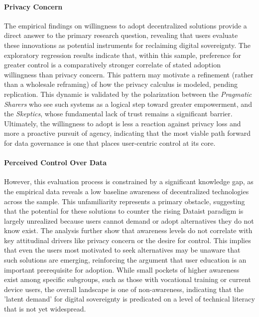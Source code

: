 	\paragraph{Privacy Concern}
	The empirical findings on willingness to adopt decentralized solutions provide a direct answer to the primary research question, revealing that users evaluate these innovations as potential instruments for reclaiming digital sovereignty. The exploratory regression results indicate that, within this sample, preference for greater control is a comparatively stronger correlate of stated adoption willingness than privacy concern. This pattern may motivate a refinement (rather than a wholesale reframing) of how the privacy calculus is modeled, pending replication. This dynamic is validated by the polarization between the \textit{Pragmatic Sharers} who see such systems as a logical step toward greater empowerment, and the \textit{Skeptics}, whose fundamental lack of trust remains a significant barrier. Ultimately, the willingness to adopt is less a reaction against privacy loss and more a proactive pursuit of agency, indicating that the most viable path forward for data governance is one that places user-centric control at its core.

	\paragraph{Perceived Control Over Data}
	However, this evaluation process is constrained by a significant knowledge gap, as the empirical data reveals a low baseline awareness of decentralized technologies across the sample. This unfamiliarity represents a primary obstacle, suggesting that the potential for these solutions to counter the rising Dataist paradigm is largely unrealized because users cannot demand or adopt alternatives they do not know exist. The analysis further show that awareness levels do not correlate with key attitudinal drivers like privacy concern or the desire for control. This implies that even the users most motivated to seek alternatives may be unaware that such solutions are emerging, reinforcing the argument that user education is an important prerequisite for adoption. While small pockets of higher awareness exist among specific subgroups, such as those with vocational training or current device users, the overall landscape is one of non-awareness, indicating that the 'latent demand' for digital sovereignty is predicated on a level of technical literacy that is not yet widespread.

